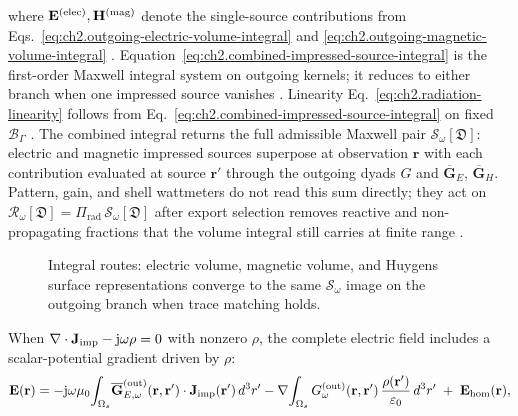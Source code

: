 where \(\mathbf{E}^{(\mathrm{elec})},\mathbf{H}^{(\mathrm{mag})}\) denote the single-source contributions
from Eqs.~\eqref{eq:ch2.outgoing-electric-volume-integral} and
\eqref{eq:ch2.outgoing-magnetic-volume-integral} \cite{stratton1941}.
Equation~\eqref{eq:ch2.combined-impressed-source-integral} is the first-order Maxwell
integral system on outgoing kernels; it reduces to either branch when one impressed
source vanishes \cite{stratton1941}. Linearity
Eq.~\eqref{eq:ch2.radiation-linearity} follows from Eq.~\eqref{eq:ch2.combined-impressed-source-integral}
on fixed \(\mathcal{B}_\Gamma\) \cite{harrington2001}. The combined integral returns the full
admissible Maxwell pair $\mathcal{S}_\omega[\mathfrak{D}]$: electric and magnetic impressed
sources superpose at observation $\mathbf{r}$ with each contribution evaluated at source
$\mathbf{r}'$ through the outgoing dyads $G$ and $\overline{\mathbf{G}}_{E}$,
$\overline{\mathbf{G}}_{H}$. Pattern, gain, and shell wattmeters do not read this sum directly;
they act on $\mathcal{R}_\omega[\mathfrak{D}]=\Pi_{\mathrm{rad}}\,\mathcal{S}_\omega[\mathfrak{D}]$
after export selection removes reactive and non-propagating fractions that the volume integral
still carries at finite range \cite{stratton1941}.
\begin{figure}[t]
\centering
{}
\caption{Integral routes: electric volume, magnetic volume, and Huygens surface
representations converge to the same \(\mathcal{S}_\omega\) image on the outgoing branch when
trace matching holds.}
\label{fig:ch2.source-to-field-integral-routes}
\end{figure}
When \(\nabla\cdot\mathbf{J}_{\mathrm{imp}}-\mathrm{j}\omega\rho=0\) with nonzero \(\rho\), the complete electric field
includes a scalar-potential gradient driven by \(\rho\):
\begin{equation}
\label{eq:ch2.charge-augmented-electric-integral}
\mathbf{E}(\mathbf{r})
=
-\mathrm{j}\omega\mu_0\!\int_{\Omega_s}\!
\overline{\mathbf{G}}_{E,\omega}^{\mathrm{(out)}}(\mathbf{r},\mathbf{r}')\cdot\mathbf{J}_{\mathrm{imp}}(\mathbf{r}')\,d^{3}r'
-\nabla\!\int_{\Omega_s} G_\omega^{\mathrm{(out)}}(\mathbf{r},\mathbf{r}')\,
\frac{\rho(\mathbf{r}')}{\varepsilon_0}\,d^{3}r'
\;+\;\mathbf{E}_{\mathrm{hom}}(\mathbf{r}),
\end{equation}
